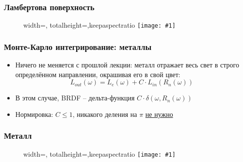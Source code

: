 \documentclass[handout,10pt]{beamer}
\newcommand{\slideimage}[1]{
  \begin{figure}
    \begin{adjustbox}{width=\textwidth, totalheight=\textheight-2\baselineskip-2\baselineskip,keepaspectratio}
      \texttt{[image: \#1]}
    \end{adjustbox}
  \end{figure}
}
\begin{document}
\begin{frame}[fragile]
\frametitle{Ламбертова поверхность}
\slideimage{cool.png}
\end{frame}

\begin{frame}[fragile]
\frametitle{Монте-Карло интегрирование: металлы}
\begin{itemize}
\item Ничего не меняется с прошлой лекции: металл отражает весь свет в строго определённом направлении, окрашивая его в свой цвет:
\begin{equation*}
L_{out}(\omega) = L_e(\omega) + C \cdot L_{in}(R_n(\omega))
\end{equation*}
\pause
\item В этом случае, BRDF -- дельта-функция \begin{math}C \cdot \delta(\omega, R_n(\omega))\end{math}
\pause
\item Нормировка: \begin{math}C\leq 1\end{math}, никакого деления на \begin{math}\pi\end{math} \underline{не нужно}
\end{itemize}
\end{frame}

\begin{frame}[fragile]
\frametitle{Металл}
\slideimage{cool3.png}
\end{frame}
\end{document}
